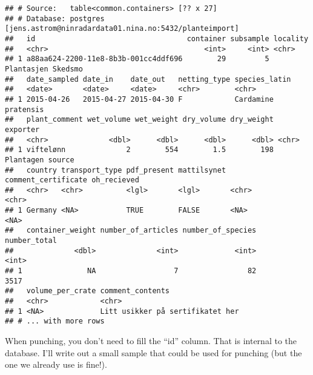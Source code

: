 \documentclass[]{article}
\newenvironment{Shaded}{\begin{snugshade}}{\end{snugshade}}
\newcommand{\CommentTok}[1]{\textcolor[rgb]{0.56,0.35,0.01}{\textit{#1}}}
\newcommand{\DataTypeTok}[1]{\textcolor[rgb]{0.13,0.29,0.53}{#1}}
\newcommand{\DecValTok}[1]{\textcolor[rgb]{0.00,0.00,0.81}{#1}}
\newcommand{\KeywordTok}[1]{\textcolor[rgb]{0.13,0.29,0.53}{\textbf{#1}}}
\newcommand{\NormalTok}[1]{#1}
\newcommand{\OperatorTok}[1]{\textcolor[rgb]{0.81,0.36,0.00}{\textbf{#1}}}
\newcommand{\StringTok}[1]{\textcolor[rgb]{0.31,0.60,0.02}{#1}}
\begin{document}
\begin{verbatim}
## # Source:   table<common.containers> [?? x 27]
## # Database: postgres [jens.astrom@ninradardata01.nina.no:5432/planteimport]
##   id                                   container subsample locality          
##   <chr>                                    <int>     <int> <chr>             
## 1 a88aa624-2200-11e8-8b3b-001cc4ddf696        29         5 Plantasjen Skedsmo
##   date_sampled date_in    date_out   netting_type species_latin      
##   <date>       <date>     <date>     <chr>        <chr>              
## 1 2015-04-26   2015-04-27 2015-04-30 F            Cardamine pratensis
##   plant_comment wet_volume wet_weight dry_volume dry_weight exporter        
##   <chr>              <dbl>      <dbl>      <dbl>      <dbl> <chr>           
## 1 viftelønn              2        554        1.5        198 Plantagen source
##   country transport_type pdf_present mattilsynet comment_certificate oh_recieved
##   <chr>   <chr>          <lgl>       <lgl>       <chr>               <chr>      
## 1 Germany <NA>           TRUE        FALSE       <NA>                <NA>       
##   container_weight number_of_articles number_of_species number_total
##              <dbl>              <int>             <int>        <int>
## 1               NA                  7                82         3517
##   volume_per_crate comment_contents                
##   <chr>            <chr>                           
## 1 <NA>             Litt usikker på sertifikatet her
## # ... with more rows
\end{verbatim}

When punching, you don't need to fill the ``id'' column. That is
internal to the database. I'll write out a small sample that could be
used for punching (but the one we already use is fine!).

\begin{Shaded}
\end{Shaded}
\end{document}

